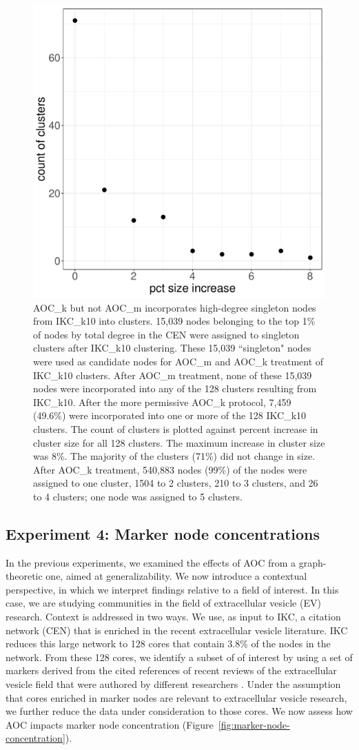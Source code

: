 \documentclass[12pt, oneside]{article}   	%
\begin{document}
{\begin{figure}
\centering
\includegraphics[width=0.6\linewidth]{singletons.pdf} 
\captionsetup{width=0.9\textwidth}
\caption{AOC\_k but not AOC\_m incorporates high-degree singleton nodes from IKC\_k10 into clusters. 15,039 nodes belonging to the top  1\% of nodes by total degree in the CEN were assigned to singleton clusters after IKC\_k10 clustering. These 15,039  ``singleton" nodes were used as candidate nodes for AOC\_m and AOC\_k treatment of IKC\_k10 clusters. After AOC\_m treatment, none of these 15,039 nodes were incorporated into any of the 128 clusters resulting from  IKC\_k10. After the more permissive AOC\_k protocol, 7,459 (49.6\%) were incorporated into one or more of the 128 IKC\_k10 clusters. The count of clusters is plotted against percent increase in cluster size for all 128 clusters. The maximum increase in cluster size was 8\%. The majority of the clusters (71\%) did not change in size. After AOC\_k treatment, 540,883 nodes (99\%) of the nodes were assigned to one cluster, 1504 to 2 clusters, 210 to 3 clusters, and 26 to 4 clusters; one node was assigned to 5 clusters.}
\label{fig:singleton}
\end{figure}
	
\subsection{Experiment 4: Marker node concentrations}

In the previous experiments, we examined the effects of AOC from a graph-theoretic one, aimed at generalizability. We now introduce a contextual perspective, in which we interpret findings relative to a field of interest. In this case, we are studying communities in the field of extracellular vesicle (EV) research. Context is addressed in two ways. We use, as input to IKC, a citation network (CEN) that is enriched in the recent extracellular vesicle literature. IKC reduces this large network to 128 cores that contain 3.8\% of the nodes in the network. From these 128 cores, we identify a subset of of interest by using a set of markers derived from the cited references of recent reviews of the extracellular vesicle field that were authored by different researchers \citep{Wedell2022}. Under the assumption that cores enriched in marker nodes are relevant to extracellular vesicle research, we further reduce the data under consideration to those cores. We now assess how AOC impacts marker node concentration (Figure~\ref{fig:marker-node-concentration}).

}
\end{document}
